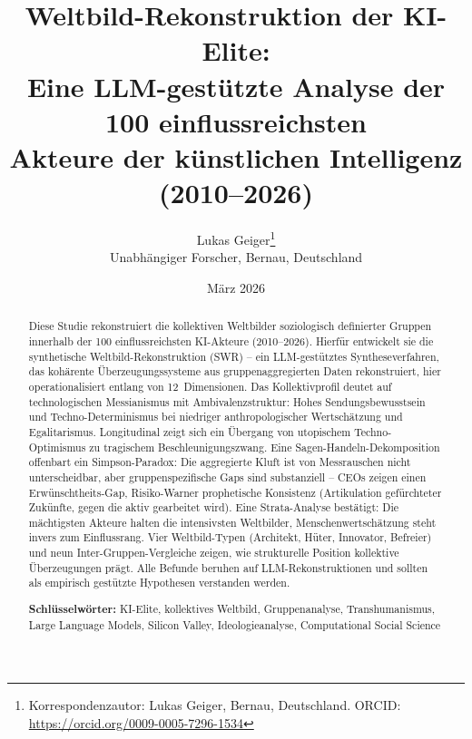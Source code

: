 \documentclass[12pt,a4paper]{article}
\title{%
  \sffamily\bfseries
  Weltbild-Rekonstruktion der KI-Elite:\\[0.3em]
  \large Eine LLM-gest\"utzte Analyse der 100 einflussreichsten\\
  Akteure der k\"unstlichen Intelligenz (2010--2026)%
}
\author{%
  Lukas Geiger\thanks{Korrespondenzautor: Lukas Geiger, Bernau, Deutschland. ORCID: \url{https://orcid.org/0009-0005-7296-1534}}\\[0.3em]
  \small Unabh\"angiger Forscher, Bernau, Deutschland
}
\date{M\"arz 2026}
\begin{document}


\maketitle
\thispagestyle{empty}

\begin{abstract}
\noindent
Diese Studie rekonstruiert die kollektiven Weltbilder soziologisch definierter Gruppen innerhalb der 100 einflussreichsten KI-Akteure (2010--2026). Hierf\"ur entwickelt sie die synthetische Weltbild-Rekonstruktion (SWR) -- ein LLM-gest\"utztes Syntheseverfahren, das koh\"arente \"Uberzeugungssysteme aus gruppenaggregierten Daten rekonstruiert, hier operationalisiert entlang von 12~Dimensionen. Das Kollektivprofil deutet auf \glqq technologischen Messianismus mit Ambivalenzstruktur\grqq: Hohes Sendungsbewusstsein und Techno-Determinismus bei niedriger anthropologischer Wertsch\"atzung und Egalitarismus. Longitudinal zeigt sich ein \"Ubergang von utopischem Techno-Optimismus zu tragischem Beschleunigungszwang. Eine Sagen-Handeln-Dekomposition offenbart ein Simpson-Paradox: Die aggregierte Kluft ist von Messrauschen nicht unterscheidbar, aber gruppenspezifische Gaps sind substanziell -- CEOs zeigen einen Erw\"unschtheits-Gap, Risiko-Warner prophetische Konsistenz (Artikulation gef\"urchteter Zuk\"unfte, gegen die aktiv gearbeitet wird). Eine Strata-Analyse best\"atigt: Die m\"achtigsten Akteure halten die intensivsten Weltbilder, Menschenwertsch\"atzung steht invers zum Einflussrang. Vier Weltbild-Typen (Architekt, H\"uter, Innovator, Befreier) und neun Inter-Gruppen-Vergleiche zeigen, wie strukturelle Position kollektive \"Uberzeugungen pr\"agt. Alle Befunde beruhen auf LLM-Rekonstruktionen und sollten als empirisch gest\"utzte Hypothesen verstanden werden.

\medskip
\noindent\textbf{Schl\"usselw\"orter:} KI-Elite, kollektives Weltbild, Gruppenanalyse, Transhumanismus, Large Language Models, Silicon Valley, Ideologieanalyse, Computational Social Science
\end{abstract}

\newpage
\setcounter{page}{1}

\end{document}
